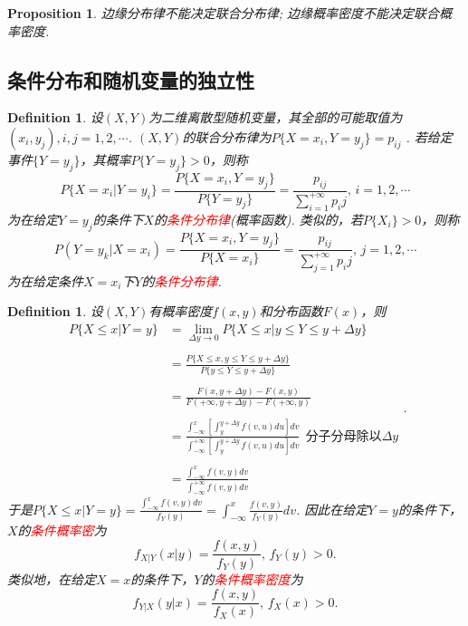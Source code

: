 \documentclass{article}
\newtheorem{proposition}[theorem]{Proposition}
\newtheorem{definition}[theorem]{Definition}
\newcommand{\redt}[1]{\textcolor{red}{#1}}
\begin{document}
\begin{proposition}
\rm 边缘分布律不能决定联合分布律; 边缘概率密度不能决定联合概率密度. 
\end{proposition}

\subsection{条件分布和随机变量的独立性}

\begin{definition}
\rm 设$(X,Y)$为二维离散型随机变量，其全部的可能取值为$(x_i,y_j), i,j=1,2,\cdots$. $(X,Y)$的联合分布律为$P\{X=x_i,Y=y_j\}=p_{ij}$ . 若给定事件$\{Y=y_j\}$，其概率$P\{Y=y_j\} > 0$，则称
$$
P\{X=x_i | Y=y_i\} = \frac{P\{X=x_i,Y=y_j\}}{P\{Y=y_j\}} = \frac{p_{ij}}{\sum\limits_{i=1}^{+\infty} p_ij}, \, i=1,2,\cdots 
$$
为在给定$Y=y_j$的条件下$X$的\redt{条件分布律}(概率函数). 类似的，若$P\{X_i\}>0$，则称
$$
P(Y=y_k|X=x_i) = \frac{P\{X=x_i,Y=y_j\}}{P\{X=x_i\}} = \frac{p_{ij}}{\sum\limits_{j=1}^{+\infty} p_ij}, \, j=1,2,\cdots
$$
为在给定条件$X=x_i$下$Y$的\redt{条件分布律}. 
\end{definition}

\begin{definition}
\rm 设$(X,Y)$有概率密度$f(x,y)$和分布函数$F(x)$，则
$$
\begin{array}{ll}
P\{X \leq x|Y = y\} &= \lim\limits_{\Delta y \to 0}P\{X \leq x|y \leq Y \leq y+\Delta y\} \\ \\
&= \frac{P\{X \leq x, y \leq Y \leq y+\Delta y\}}{P\{y \leq Y \leq y+\Delta y\}} \\ \\
&= \frac{F(x,y+\Delta y)-F(x,y)}{F(+\infty,y+\Delta y)-F(+\infty, y)} \\ \\
&= \frac{\int_{-\infty}^{x}\left[\int_{y}^{y +\Delta y}f(v,u)du\right]dv}{\int^{+\infty}_{-\infty} \left[\int_{y}^{y + \Delta y} f(v,u)du\right]dv} ~~ \text{分子分母除以$\Delta y$} \\ \\
&= \frac{\int_{-\infty}^{x}f(v,y)dv}{\int^{+\infty}_{-\infty} f(v,y)dv}
\end{array}.
$$
于是$P\{X \leq x|Y = y\}= \frac{\int_{-\infty}^{x}f(v,y)dv}{f_Y(y)} = \int_{-\infty}^{x}\frac{f(v,y)}{f_Y(y)}dv$. 因此在给定$Y=y$的条件下，$X$的\redt{条件概率密}为
$$
f_{X|Y}(x|y) = \frac{f(x,y)}{f_Y(y)}, \, f_Y(y) > 0.
$$
类似地，在给定$X=x$的条件下，$Y$的\redt{条件概率密度}为
$$
f_{Y|X}(y|x) = \frac{f(x,y)}{f_X(x)}, \, f_X(x) > 0.
$$
\end{definition}
\end{document}

